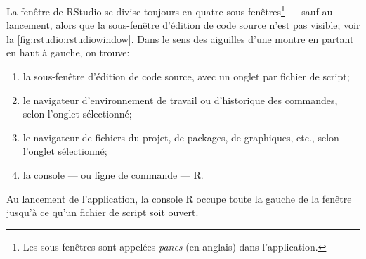 La fenêtre de RStudio se divise toujours en quatre
sous-fenêtres\footnote{%
  Les sous-fenêtres sont appelées \emph{panes} (en anglais) dans
  l'application.} %
--- sauf au lancement, alors que la sous-fenêtre d'édition de code
source n'est pas visible; voir la \autoref{fig:rstudio:rstudiowindow}.
Dans le sens des aiguilles d'une montre en partant en haut à gauche,
on trouve:
\begin{enumerate}
\item la sous-fenêtre d'édition de code source, avec un onglet par
  fichier de script;
\item le navigateur d'environnement de travail ou d'historique des
  commandes, selon l'onglet sélectionné;
\item le navigateur de fichiers du projet, de packages, de graphiques,
  etc., selon l'onglet sélectionné;
\item la console --- ou ligne de commande --- R.
\end{enumerate}
Au lancement de l'application, la console R occupe toute la gauche de
la fenêtre jusqu'à ce qu'un fichier de script soit ouvert.

